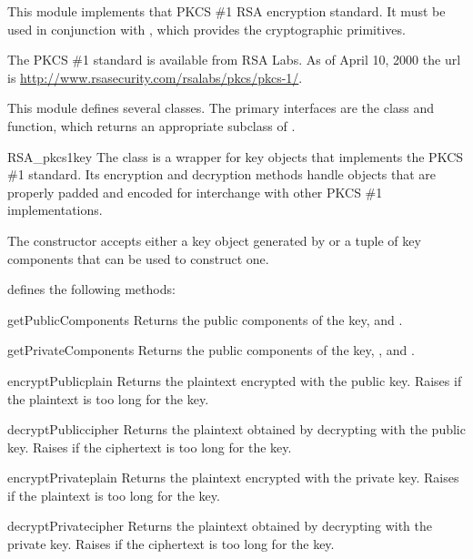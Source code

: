 \documentclass{howto}
\begin{document}
This module implements that PKCS \#1 RSA encryption standard.  It must
be used in conjunction with , which
provides the cryptographic primitives.

The PKCS \#1 standard is available from RSA Labs.  As of April 10, 2000
the url is \url{http://www.rsasecurity.com/rsalabs/pkcs/pkcs-1/}.

This module defines several classes.  The primary interfaces are the
 class and  function,
which returns an appropriate subclass of .

\begin{classdesc}{RSA_pkcs1}{key}
The  class is a wrapper for
 key objects that implements the PKCS \#1
standard.  Its encryption and decryption methods handle objects that
are properly padded and encoded for interchange with other PKCS \#1
implementations. 

The constructor accepts either a key object generated by
 or a tuple of key components that can be
used to construct one.

 defines the following methods:

\begin{methoddesc}{getPublicComponents}{}
Returns the public components of the key,  and .
\end{methoddesc}

\begin{methoddesc}{getPrivateComponents}{}
Returns the public components of the key, ,  and .
\end{methoddesc}

\begin{methoddesc}{encryptPublic}{plain}
Returns the plaintext  encrypted with the public key.
Raises  if the plaintext is too long for the key.
\end{methoddesc}

\begin{methoddesc}{decryptPublic}{cipher}
Returns the plaintext obtained by decrypting  with the
public key.  Raises  if the ciphertext is too long for the key.
\end{methoddesc}

\begin{methoddesc}{encryptPrivate}{plain}
Returns the plaintext  encrypted with the private key.
Raises  if the plaintext is too long for the key.
\end{methoddesc}

\begin{methoddesc}{decryptPrivate}{cipher}
Returns the plaintext obtained by decrypting  with the
private key.  Raises  if the ciphertext is too long for the key.
\end{methoddesc}

\end{classdesc}
\end{document}
